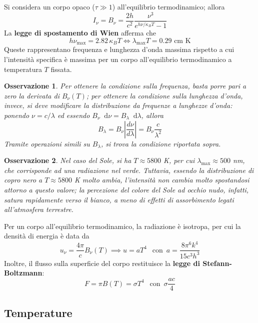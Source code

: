 \documentclass[11pt, a4paper]{scrartcl}
\theoremstyle{style}
\newtheorem{osservazione}{Osservazione}[section]
\theoremstyle{style1}
\newenvironment{boxenv}[1][]{
    \begin{eqbox}[#1]
    }{
   \end{eqbox}
}
\newcommand{\dd}{\mathop{}\!\mathrm{d}}
\numberwithin{equation}{subsection}
\begin{document}
Si considera un corpo opaco ($\tau \gg 1$) all'equilibrio termodinamico; allora
\[
I_\nu  = B_\nu  = \frac{2h}{c^2}\frac{\nu ^3}{e^{h\nu  / \kappa _B T} -1 }
\] 
La \textbf{legge di spostamento di Wien} afferma che
\begin{equation}
	h \nu _\text{max} = 2.82 \, \kappa _B T \iff \lambda _\text{max} T = 0.29\text{ cm K}
\end{equation}
Queste rappresentano frequenza e lunghezza d'onda massima rispetto a cui l'intensit\`a specifica \`e massima per un corpo all'equilibrio termodinamico a temperatura $T$ fissata.
\begin{boxenv}[]
\begin{osservazione}
Per ottenere la condizione sulla frequenza, basta porre pari a zero la derivata di $B_\nu (T)$; per ottenere la condizione sulla lunghezza d'onda, invece, si deve modificare la distribuzione da frequenze a lunghezze d'onda: ponendo $\nu  = c / \lambda $ ed essendo $B_\nu \dd \nu  = B_\lambda \dd \lambda $, allora 
\[
B_\lambda  = B_\nu  \left\lvert \frac{d \nu }{d \lambda }  \right\rvert = B_\nu  \frac{c}{\lambda ^2}
\] 
Tramite operazioni simili su $B_\lambda $, si trova la condizione riportata sopra.
\end{osservazione}
\end{boxenv}
\begin{osservazione}
Nel caso del Sole, si ha $T \approx 5800$ K, per cui $\lambda _\text{max} \approx 500$ nm, che corrisponde ad una radiazione nel verde.
Tuttavia, essendo la distribuzione di copro nero a $T\approx 5800$ K molto ambia, l'intensit\`a non cambia molto spostandosi attorno a questo valore; la percezione del colore del Sole ad occhio nudo, infatti, satura rapidamente verso il bianco, a meno di effetti di assorbimento legati all'atmosfera terrestre.
\end{osservazione}
\noindent Per un corpo all'equilibrio termodinamico, la radiazione \`e isotropa, per cui la densit\`a di energia \`e data da
\[
u_\nu  = \frac{4\pi}{c} B_\nu (T) \implies u = aT^4 \ \ \text{ con } \, a = \frac{8 \pi ^6 k^4}{15 c^3 h^3}
\] 
Inoltre, il flusso sulla superficie del corpo restituisce la \textbf{legge di Stefann-Boltzmann}:
\[
F = \pi B(T) = \sigma T^4 \ \ \text{ con } \, \sigma \frac{ac}{4}
\] 
\subsection{Temperature}
\end{document}
